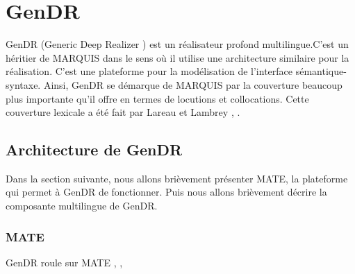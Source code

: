 
\chapter{GenDR}\label{chapgendr}

GenDR (Generic Deep Realizer \citep{lareau18}) est un réalisateur profond multilingue.C'est un héritier de MARQUIS dans le sens où il utilise une architecture similaire pour la réalisation. C'est une plateforme pour la modélisation de l'interface sémantique-syntaxe. Ainsi, GenDR se démarque de MARQUIS par la couverture beaucoup plus importante qu'il offre en termes de locutions et collocations. Cette couverture lexicale a été fait par Lareau et Lambrey \cite{LambreyImplementationcollocationspour2017}, \cite{lambrey15}.

\section{Architecture de GenDR}

Dans la section suivante, nous allons brièvement présenter MATE, la plateforme qui permet à GenDR de fonctionner. Puis nous allons brièvement décrire la composante multilingue de GenDR.

\subsection{MATE}

GenDR roule sur MATE \citep{BohnetDevelopmentEnvironmentMTTbased2000}, \citep{BohnetOpensourcegraph2010},\citep{Lareau2007TowardsAG}

